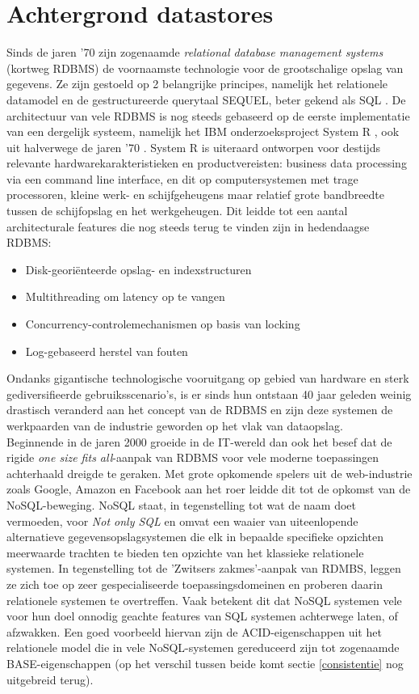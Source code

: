 \chapter{Achtergrond datastores}
\label{datastores_intro}

Sinds de jaren '70 zijn zogenaamde \textit{relational database management systems} (kortweg RDBMS) de voornaamste technologie voor de grootschalige opslag van gegevens. Ze zijn gestoeld op 2 belangrijke principes, namelijk het relationele datamodel \cite{codd1970relational} en de gestructureerde querytaal SEQUEL, beter gekend als SQL \cite{chamberlin1974sequel}. De architectuur van vele RDBMS is nog steeds gebaseerd op de eerste implementatie van een dergelijk systeem, namelijk het IBM onderzoeksproject System R \cite{blasgen1981system}, ook uit halverwege de jaren '70 \cite{Stonebraker:2007:EAE:1325851.1325981}. System R is uiteraard ontworpen voor destijds relevante hardwarekarakteristieken en productvereisten: business data processing via een command line interface, en dit op computersystemen met trage processoren, kleine werk- en schijfgeheugens maar relatief grote bandbreedte tussen de schijfopslag en het werkgeheugen. Dit leidde tot een aantal architecturale features die nog steeds terug te vinden zijn in hedendaagse RDBMS:
\begin{itemize}
\item Disk-geori\"enteerde opslag- en indexstructuren
\item Multithreading om latency op te vangen
\item Concurrency-controlemechanismen op basis van locking
\item Log-gebaseerd herstel van fouten
\end{itemize} 
Ondanks gigantische technologische vooruitgang op gebied van hardware en sterk gediversifieerde gebruiksscenario's, is er sinds hun ontstaan 40 jaar geleden weinig drastisch veranderd aan het concept van de RDBMS en zijn deze systemen de werkpaarden van de industrie geworden op het vlak van dataopslag.\\

Beginnende in de jaren 2000 groeide in de IT-wereld dan ook het besef dat de rigide \textit{one size fits all}-aanpak van RDBMS voor vele moderne toepassingen achterhaald dreigde te geraken. Met grote opkomende spelers uit de web-industrie zoals Google, Amazon en Facebook aan het roer leidde dit tot de opkomst van de NoSQL-beweging. NoSQL staat, in tegenstelling tot wat de naam doet vermoeden, voor \textit{Not only SQL} en omvat een waaier van uiteenlopende alternatieve gegevensopslagsystemen die elk in bepaalde specifieke opzichten meerwaarde trachten te bieden ten opzichte van het klassieke relationele systemen. In tegenstelling tot de 'Zwitsers zakmes'-aanpak van RDMBS, leggen ze zich toe op zeer gespecialiseerde toepassingsdomeinen en proberen daarin relationele systemen te overtreffen. Vaak betekent dit dat NoSQL systemen vele voor hun doel onnodig geachte features van SQL systemen achterwege laten, of afzwakken. Een goed voorbeeld hiervan zijn de ACID-eigenschappen uit het relationele model die in vele NoSQL-systemen gereduceerd zijn tot zogenaamde BASE-eigenschappen (op het verschil tussen beide komt sectie \ref{consistentie} nog uitgebreid terug).

